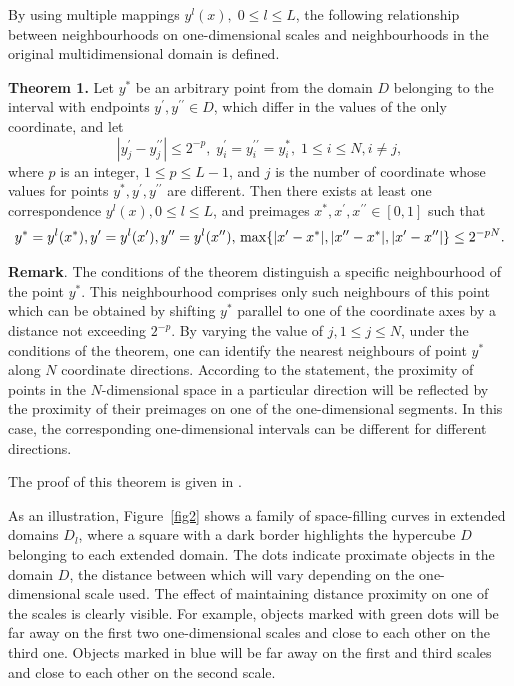 \documentclass[entropy,article,submit,moreauthors,pdftex]{Definitions/mdpi}
\begin{document}
By using multiple mappings $y^l(x), \; 0 \leq l \leq L$, the following relationship between neighbourhoods on one-dimensional scales and neighbourhoods in the original multidimensional domain is defined.

\textbf{Theorem 1.} Let $y^*$ be an arbitrary point from the domain $D$ belonging to the interval with endpoints $y^\prime, y^{\prime\prime} \in D$, which differ in the values of the only coordinate, and let
\begin{equation}\label{y_prime}
|y_j^\prime - y^{\prime\prime}_j| \leq 2^{-p}, \; y^\prime_i = y^{\prime\prime}_i = y_i^*, \; 1 \leq i \leq N, i \ne j,
\end{equation} 
where $p$ is an integer, $1 \leq p \leq L-1$, and $j$ is the number of coordinate whose values for points $y^*, y^\prime, y^{\prime\prime}$ are different. Then there exists at least one correspondence $y^l(x), 0 \leq l \leq L$, and preimages $x^*, x^\prime, x^{\prime\prime} \in [0, 1]$ such that
\[
 y^* = y^l(x^*), y^\prime = y^l(x^\prime), y^{\prime\prime} = y^l(x^{\prime\prime}), \\
\max \{ |x^\prime - x^*|, |x^{\prime\prime} - x^*|, |x^\prime - x^{\prime\prime}| \} \leq 2^{-pN}.
\] 

\textbf{Remark}. The conditions of the theorem distinguish a specific neighbourhood of the point $y^*$. This neighbourhood comprises only such neighbours of this point which can be obtained by  shifting $y^*$ parallel to one of the coordinate axes by a distance not exceeding $2^{-p}$. By varying the value of $j, 1 \leq j \leq N$, under the conditions of the theorem, one can identify the nearest neighbours of point $y^*$ along $N$ coordinate directions. According to the statement, the proximity of points in the $N$-dimensional space in a particular direction will be reflected by the proximity of their preimages on one of the one-dimensional segments. In this case, the corresponding one-dimensional intervals can be different for different directions.

The proof of this theorem is given in \cite{Strongin2000}.

As an illustration, Figure~\ref{fig2} shows a family of space-filling curves in extended domains $D_l$, where a square with a dark border highlights the hypercube $D$ belonging to each extended domain. The dots indicate proximate objects in the domain $D$, the distance between which will vary depending on the one-dimensional scale used. The effect of maintaining distance proximity on one of the scales is clearly visible. For example, objects marked with green dots will be far away on the first two one-dimensional scales and close to each other on the third one. Objects marked in blue will be far away on the first and third scales and close to each other on the second scale. 
\end{document}
